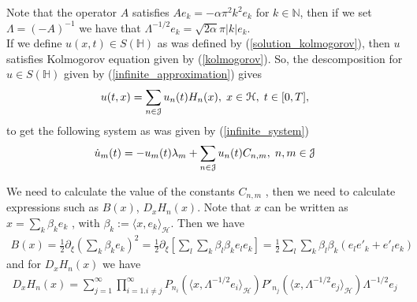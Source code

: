 	\noindent Note that the operator $A$ satisfies $Ae_k = -\alpha \pi^2 k^2 e_k$ for $k \in \mathbb{N}$, then if we set $\Lambda = (-A)^{-1}$ we have that $\Lambda^{-1/2} e_k = \sqrt{2 \alpha} \pi |k| e_k$. \\	
		
	\noindent If we define $u(x, t) \in S (\mathbb{H})$ as was defined by (\ref{solution_kolmogorov}), then $u$  satisfies Kolmogorov equation given by (\ref{kolmogorov}). So, the descomposition for $u \in S (\mathbb{H})$ given by (\ref{infinite_approximation}) gives 
	\begin{align}
		u(t, x) = \displaystyle \sum _{n \in \mathcal{J}} u_{n}(t) H_n (x), \hspace{0.1cm} x \in \mathcal{H}, \hspace{0.1cm} t \in [0, T],
	\end{align}		
	to get the following system as was given by (\ref{infinite_system})
	\begin{align}
		\dot{u}_{m} (t) = -u_{m} (t) \lambda_{m} + \displaystyle \sum _{n \in \mathcal{J}} u_{n} (t) C_{n, m} , \hspace{0.1cm} n, m \in \mathcal{J}
	\end{align}
		
	\noindent We need to calculate the value of the constants $C_{n,m}$ , then we need to calculate expressions such as $B(x)$, $D_x H_n (x)$. Note that $x$ can be written as $x = \displaystyle \sum_k \beta_k e_k$ , with $\beta_k := \langle x, e_k \rangle_{\mathcal{H}}$. Then we have
	\begin{align*}
		B(x) = \frac{1}{2} \partial_{\xi} \left( \displaystyle \sum_k \beta_k e_k \right)^2 = \frac{1}{2} \partial_{\xi} \left[ \sum_l
		\sum_k \beta_l \beta_k e_l e_k \right] = \frac{1}{2} \sum_l
		\sum_k \beta_l \beta_k (e_l e'_k + e'_l e_k)
	\end{align*}
	and for $D_x H_n (x)$ we have
	\begin{align*}
		D_x H_n (x) = \displaystyle \sum_{j = 1}^{\infty} \prod_{i = 1. i \neq j}^{\infty} P_{n_i} (\langle x, \Lambda^{-1 / 2} e_i \rangle_{\mathcal{H}}) P'_{n_j} (\langle x, \Lambda^{-1 / 2} e_j \rangle_{\mathcal{H}}) \Lambda^{-1 / 2} e_j 
	\end{align*}
	

